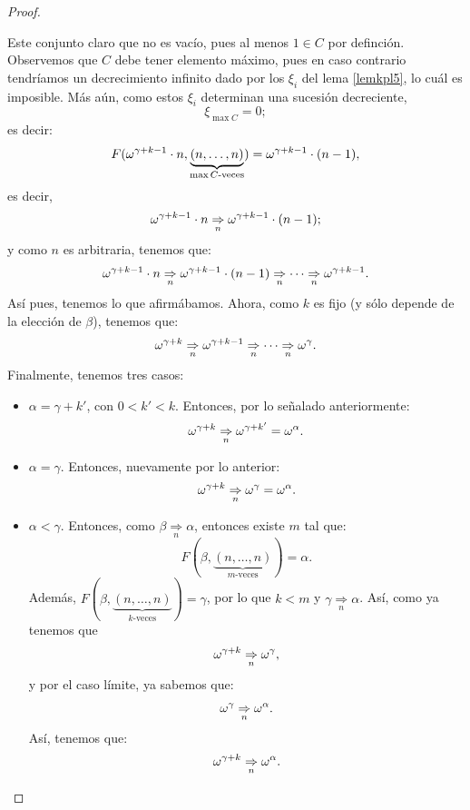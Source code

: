 \begin{proof}
\begin{enumerate}
\begin{itemize}
                    Este conjunto claro que no es vacío, pues al menos $1\in C$ por definción.
                    Observemos que $C$ debe tener elemento máximo, pues en caso contrario tendríamos un decrecimiento infinito dado por los $\xi_i$ del lema {\ref{lemkpl5}}, lo cuál es imposible. Más aún, como estos $\xi_i$ determinan una sucesión decreciente, 
                    \[\xi_{\max{C}}=0;\]
                    es decir:
                    \[F(\omega^{\gamma+k-1}\cdot n,\underbrace{(n,\ldots,n)}_{\max{C}\text{-veces}})=\omega^{\gamma+k-1}\cdot(n-1),\]
                    es decir,
                    \[\omega^{\gamma+k-1}\cdot n\underset{n}{\Rightarrow}\omega^{\gamma+k-1}\cdot (n-1);\]
                    y como $n$ es arbitraria, tenemos que:
                    \[\omega^{\gamma+k-1}\cdot n\underset{n}{\Rightarrow}\omega^{\gamma+k-1}\cdot (n-1)\underset{n}{\Rightarrow}\cdots\underset{n}{\Rightarrow}\omega^{\gamma+k-1}.\]
                    Así pues, tenemos lo que afirmábamos.
                    Ahora, como $k$ es fijo (y sólo depende de la elección de $\beta$), tenemos que:
                    \[\omega^{\gamma+k}\underset{n}{\Rightarrow}\omega^{\gamma+k-1}\underset{n}{\Rightarrow}\cdots\underset{n}{\Rightarrow}\omega^\gamma.\]
                    Finalmente, tenemos tres casos:
                    \begin{itemize}
                        \item $\alpha=\gamma+k'$, con $0<k'<k$. Entonces, por lo señalado anteriormente:
                            \[\omega^{\gamma+k}\underset{n}{\Rightarrow}\omega^{\gamma+k'}=\omega^\alpha.\]
                        \item $\alpha=\gamma$. Entonces, nuevamente por lo anterior:
                            \[\omega^{\gamma+k}\underset{n}{\Rightarrow}\omega^{\gamma}=\omega^\alpha.\]
                        \item $\alpha<\gamma$. Entonces, como $\beta\underset{n}{\Rightarrow}\alpha$, entonces existe $m$ tal que:
                            \[F(\beta,\underbrace{(n,\ldots,n)}_{m\text{-veces}})=\alpha.\]
                            Además, $F(\beta,\underbrace{(n,\ldots,n)}_{k\text{-veces}})=\gamma$, por lo que $k<m$ y $\gamma\underset{n}{\Rightarrow}\alpha$. Así, como ya tenemos que
                            \[\omega^{\gamma+k}\underset{n}{\Rightarrow}\omega^\gamma,\]
                            y por el caso límite, ya sabemos que:
                            \[\omega^\gamma\underset{n}{\Rightarrow}\omega^\alpha.\]
                            Así, tenemos que:
                            \[\omega^{\gamma+k}\underset{n}{\Rightarrow}\omega^\alpha.\]
                    \end{itemize}

\end{itemize}
\end{enumerate}
\end{proof}

